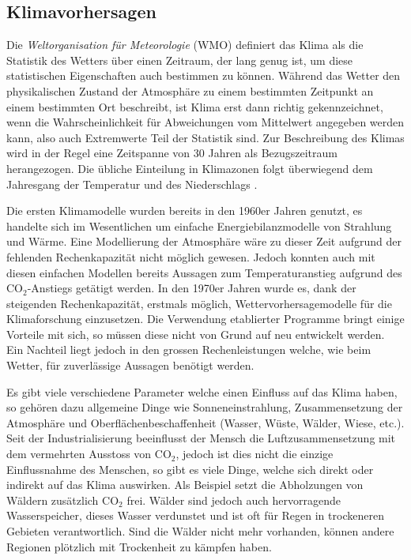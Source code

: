 \begin{refsection}
\subsection{Klimavorhersagen
\label{klima:subsection:entstehung}}
Die {\em Weltorganisation für Meteorologie} (WMO)
%
definiert das Klima als die Statistik des Wetters
über einen Zeitraum, der lang genug ist, um diese statistischen
Eigenschaften auch bestimmen zu können. Während das Wetter den
physikalischen Zustand der Atmosphäre zu einem bestimmten Zeitpunkt
an einem bestimmten Ort beschreibt, ist Klima erst dann richtig
gekennzeichnet, wenn die Wahrscheinlichkeit für Abweichungen vom
Mittelwert angegeben werden kann, also auch Extremwerte Teil der
Statistik sind. Zur Beschreibung des Klimas wird in der Regel eine
Zeitspanne von 30 Jahren als Bezugszeitraum herangezogen. Die übliche
Einteilung in Klimazonen folgt überwiegend dem Jahresgang der
Temperatur und des Niederschlags \cite{klima:maxplanck}.

Die ersten Klimamodelle wurden bereits in den 1960er Jahren genutzt,
es handelte sich im Wesentlichen um einfache Energiebilanzmodelle
von Strahlung und Wärme. Eine Modellierung der Atmosphäre wäre zu
dieser Zeit aufgrund der fehlenden Rechenkapazität nicht möglich
gewesen. Jedoch konnten auch mit diesen einfachen Modellen bereits
Aussagen zum Temperaturanstieg aufgrund des CO$_2$-Anstiegs getätigt
werden. In den 1970er Jahren wurde es, dank der steigenden
Rechenkapazität, erstmals möglich, Wettervorhersagemodelle für die
Klimaforschung einzusetzen. Die Verwendung etablierter Programme
bringt einige Vorteile mit sich, so müssen diese nicht von Grund
auf neu entwickelt werden. Ein Nachteil liegt jedoch in den grossen
Rechenleistungen welche, wie beim Wetter, für zuverlässige Aussagen
benötigt werden.
 
Es gibt viele verschiedene Parameter welche einen Einfluss auf das
Klima haben, so gehören dazu  allgemeine Dinge wie Sonneneinstrahlung,
Zusammensetzung der Atmosphäre und Oberflächenbeschaffenheit (Wasser,
Wüste, Wälder, Wiese, etc.). Seit der Industrialisierung beeinflusst
der Mensch die Luftzusammensetzung mit dem vermehrten Ausstoss von
CO$_2$, jedoch ist dies nicht die einzige Einflussnahme des Menschen,
so gibt es viele Dinge, welche sich direkt oder indirekt auf das
Klima auswirken. Als Beispiel setzt die Abholzungen von Wäldern
zusätzlich CO$_2$ frei. Wälder sind jedoch auch hervorragende
Wasserspeicher, dieses Wasser verdunstet und ist oft für Regen in
trockeneren Gebieten verantwortlich. Sind die Wälder nicht mehr
vorhanden, können andere Regionen plötzlich mit Trockenheit zu
kämpfen haben.


\end{refsection}
